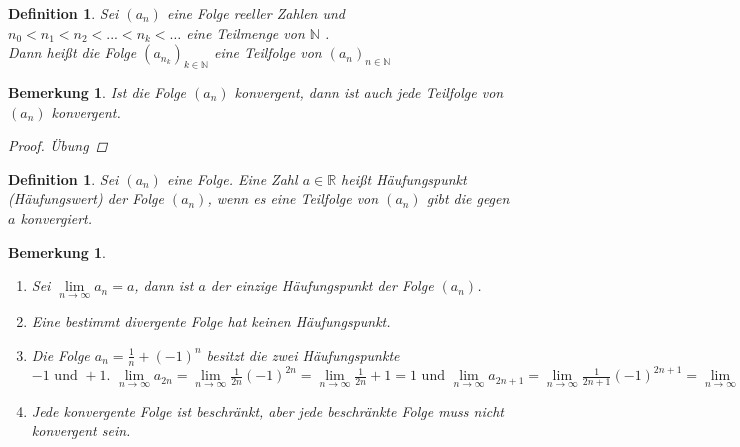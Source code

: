 \documentclass[a4paper,titlepage,oneside]{article}
\def\N{\ensuremath{\mathbb{N}} }
\def\R{\ensuremath{\mathbb{R}} }
\renewcommand{\liminf}[2][n]{\ensuremath{\lim\limits_{#1 \rightarrow \infty}{#2}}}
\theoremstyle{thmstyle}
\newtheorem{defi}[satz]{Definition}
\newtheorem{bem}[satz]{Bemerkung}
\begin{document}
\begin{defi}
Sei \((a_n)\) eine Folge reeller Zahlen und \(n_0 < n_1 < n_2 <... < n_k < \dots \) eine Teilmenge von \N.\\
Dann heißt die Folge \((a_{n_k})_{k \in \N }\) eine Teilfolge von \((a_n)_{n \in \N}\)
\end{defi}

\begin{bem}
Ist die Folge \((a_n)\) konvergent, dann ist auch jede Teilfolge von \((a_n)\) konvergent.
\begin{proof} Übung \end{proof}
\end{bem}

\begin{defi}
Sei \((a_n)\) eine Folge. Eine Zahl \(a \in \R\) heißt Häufungspunkt (Häufungswert) der Folge \((a_n)\), wenn es eine Teilfolge von \((a_n)\) gibt die gegen \(a\) konvergiert.
\end{defi}

\begin{bem}
\begin{enumerate}
\item Sei \(\liminf{a_n} = a\), dann ist \(a\) der einzige Häufungspunkt der Folge \((a_n)\).
\item Eine bestimmt divergente Folge hat keinen Häufungspunkt.
\item Die Folge \(a_n = \frac{1}{n}+ (-1)^n\) besitzt die zwei Häufungspunkte \(-1\text{ und }+1\text{. }\liminf{a_{2n}} = \liminf{\frac{1}{2n} (-1)^{2n}} = \liminf{\frac{1}{2n}} + 1 = 1 \text{ und } \liminf{a_{2n+1}} = \liminf{\frac{1}{2n+1} (-1)^{2n+1}} = \liminf{\frac{1}{2n+1}} - 1 = - 1\)
\item Jede konvergente Folge ist beschränkt, aber jede beschränkte Folge muss nicht konvergent sein.
\end{enumerate}
\end{bem}
\end{document}
